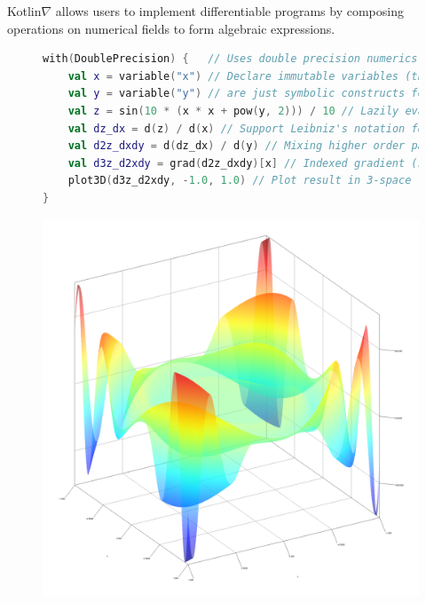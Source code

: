 \documentclass[12pt,initial,twoside,maitrise]{dms}
\numberwithin{equation}{section}
\numberwithin{table}{chapter}
\numberwithin{figure}{chapter}
\begin{document}
Kotlin$\nabla$ allows users to implement differentiable programs by composing operations on numerical fields to form algebraic expressions. %
%
%
\begin{figure}[!htb]
\begin{lstlisting}[caption={A basic Kotlin$\nabla$ program with two inputs and one output, rendered below.},label={lst:basic_kotlingrad}, basicstyle=\ttfamily\small, language=Kotlin]
with(DoublePrecision) {   // Uses double precision numerics during evaluation
    val x = variable("x") // Declare immutable variables (these variables are
    val y = variable("y") // are just symbolic constructs for differentiation)
    val z = sin(10 * (x * x + pow(y, 2))) / 10 // Lazily evaluated expression
    val dz_dx = d(z) / d(x) // Support Leibniz's notation for differentiation
    val d2z_dxdy = d(dz_dx) / d(y) // Mixing higher order partial derivatives
    val d3z_d2xdy = grad(d2z_dxdy)[x] // Indexed gradient (same as d(f)/d(x))
    plot3D(d3z_d2xdy, -1.0, 1.0) // Plot result in 3-space (-1 < x, y, z < 1)
}
\end{lstlisting}
\includegraphics[scale=0.43]{plot_result.png}
\end{figure}
\end{document}
